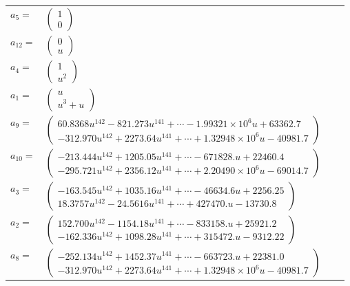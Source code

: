\documentclass[1p]{elsarticle_modified}
\theoremstyle{definition}
\begin{document}
\begin{tabular}{m{7pt} m{180pt} m{7pt} m{180pt} }
\flushright $a_{5}=$&$\begin{pmatrix}1\\0\end{pmatrix}$ \\
\flushright $a_{12}=$&$\begin{pmatrix}0\\u\end{pmatrix}$ \\
\flushright $a_{4}=$&$\begin{pmatrix}1\\u^2\end{pmatrix}$ \\
\flushright $a_{1}=$&$\begin{pmatrix}u\\u^3+u\end{pmatrix}$ \\
\flushright $a_{9}=$&$\begin{pmatrix}60.8368 u^{142}-821.273 u^{141}+\cdots-1.99321\times10^{6} u+63362.7\\-312.970 u^{142}+2273.64 u^{141}+\cdots+1.32948\times10^{6} u-40981.7\end{pmatrix}$ \\
\flushright $a_{10}=$&$\begin{pmatrix}-213.444 u^{142}+1205.05 u^{141}+\cdots-671828. u+22460.4\\-295.721 u^{142}+2356.12 u^{141}+\cdots+2.20490\times10^{6} u-69014.7\end{pmatrix}$ \\
\flushright $a_{3}=$&$\begin{pmatrix}-163.545 u^{142}+1035.16 u^{141}+\cdots-46634.6 u+2256.25\\18.3757 u^{142}-24.5616 u^{141}+\cdots+427470. u-13730.8\end{pmatrix}$ \\
\flushright $a_{2}=$&$\begin{pmatrix}152.700 u^{142}-1154.18 u^{141}+\cdots-833158. u+25921.2\\-162.336 u^{142}+1098.28 u^{141}+\cdots+315472. u-9312.22\end{pmatrix}$ \\
\flushright $a_{8}=$&$\begin{pmatrix}-252.134 u^{142}+1452.37 u^{141}+\cdots-663723. u+22381.0\\-312.970 u^{142}+2273.64 u^{141}+\cdots+1.32948\times10^{6} u-40981.7\end{pmatrix}$ \\

\end{tabular}
\end{document}
